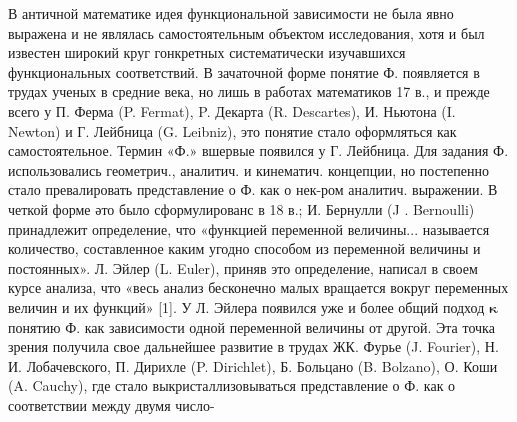 \documentclass[10pt]{article}
\begin{document}
В античной математике идея функциональной зависимости не была явно выражена и не являлась самостоятельным объектом исследования, хотя и был известен широкий круг гонкретных систематически изучавшихся функциональных соответствий. В зачаточной форме понятие Ф. появляется в трудах ученых в средние века, но лишь в работах математиков 17 в., и прежде всего у П. Ферма (P. Fermat), P. Декарта (R. Descartes), И. Ньютона (I. Newton) и Г. Лейбница (G. Leibniz), это понятие стало оформляться как самостоятельное. Термин «Ф.» вшервые появился у Г. Лейбница. Для задания Ф. использовались геометрич., аналитич. и кинематич. концепции, но постепенно стало превалировать представление о Ф. как о нек-ром аналитич. выражении. В четкой форме әто было сформулированс в 18 в.; И. Бернулли (J . Bernoulli) принадлежит определение, что «функцией переменной величины... называется количество, составленное каким угодно способом из переменной величины и постоянных». Л. Эйлер (L. Euler), приняв это определение, написал в своем курсе анализа, что «весь анализ бесконечно малых вращается вокруг переменных величин и их функций» [1]. У Л. Эйлера появился уже и более общий подход $\boldsymbol{\kappa}$ понятию Ф. как зависимости одной переменной величины от другой. Эта точка зрения получила свое дальнейшее развитие в трудах ЖК. Фурье (J. Fourier), Н. И. Лобачевского, П. Дирихле (P. Dirichlet), Б. Больцано (B. Bolzano), О. Коши (A. Cauchy), где стало выкристаллизовываться представление о Ф. как о соответствии между двумя число-
\end{document}
